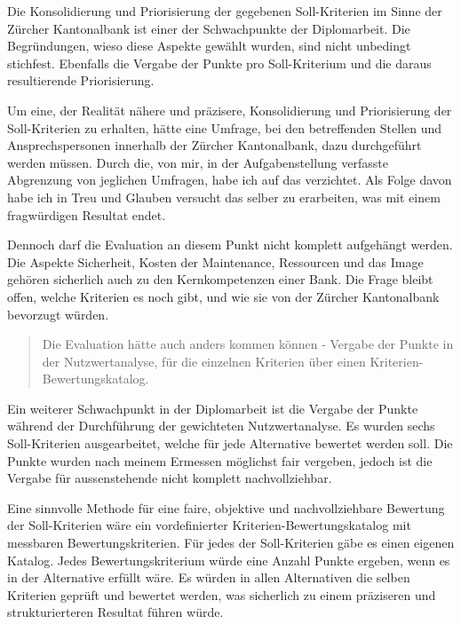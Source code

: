 Die Konsolidierung und Priorisierung der gegebenen Soll-Kriterien im Sinne der
Zürcher Kantonalbank ist einer der Schwachpunkte der Diplomarbeit. Die
Begründungen, wieso diese Aspekte gewählt wurden, sind nicht unbedingt
stichfest. Ebenfalls die Vergabe der Punkte pro Soll-Kriterium und die daraus
resultierende Priorisierung.

Um eine, der Realität nähere und präzisere, Konsolidierung und Priorisierung der
Soll-Kriterien zu erhalten, hätte eine Umfrage, bei den betreffenden Stellen und
Ansprechspersonen innerhalb der Zürcher Kantonalbank, dazu durchgeführt werden
müssen. Durch die, von mir, in der Aufgabenstellung verfasste Abgrenzung von
jeglichen Umfragen, habe ich auf das verzichtet. Als Folge davon habe ich in
Treu und Glauben versucht das selber zu erarbeiten, was mit einem fragwürdigen
Resultat endet.

Dennoch darf die Evaluation an diesem Punkt nicht komplett aufgehängt werden.
Die Aspekte Sicherheit, Kosten der Maintenance, Ressourcen und das Image gehören
sicherlich auch zu den Kernkompetenzen einer Bank. Die Frage bleibt offen,
welche Kriterien es noch gibt, und wie sie von der Zürcher Kantonalbank
bevorzugt würden.
\newline
  
\begin{quote}\begin{itshape}Die Evaluation hätte auch anders kommen können -
Vergabe der Punkte in der Nutzwertanalyse, für die einzelnen Kriterien über
einen Kriterien-Bewertungskatalog.\end{itshape}\end{quote}

Ein weiterer Schwachpunkt in der Diplomarbeit ist die Vergabe der Punkte während
der Durchführung der gewichteten Nutzwertanalyse. Es wurden sechs Soll-Kriterien
ausgearbeitet, welche für jede Alternative bewertet werden soll. Die Punkte
wurden nach meinem Ermessen möglichst fair vergeben, jedoch ist die Vergabe für
aussenstehende nicht komplett nachvollziehbar.

Eine sinnvolle Methode für eine faire, objektive und nachvollziehbare Bewertung
der Soll-Kriterien wäre ein vordefinierter Kriterien-Bewertungskatalog mit
messbaren Bewertungskriterien. Für jedes der Soll-Kriterien gäbe es einen
eigenen Katalog. Jedes Bewertungskriterium würde eine Anzahl Punkte ergeben,
wenn es in der Alternative erfüllt wäre. Es würden in allen Alternativen die
selben Kriterien geprüft und bewertet werden, was sicherlich zu einem
präziseren und strukturierteren Resultat führen würde.


